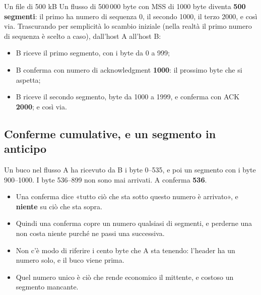 \begin{esempio}{Un file di 500 kB}
Un flusso di 500\,000 byte con MSS di 1000 byte diventa \textbf{500 segmenti}: il primo ha numero di
sequenza 0, il secondo 1000, il terzo 2000, e così via. Trascurando per semplicità lo scambio iniziale
(nella realtà il primo numero di sequenza è scelto a caso), dall'host A all'host B:
\begin{itemize}
    \item B riceve il primo segmento, con i byte da 0 a 999;
    \item B conferma con numero di acknowledgment \textbf{1000}: il prossimo byte che si aspetta;
    \item B riceve il secondo segmento, byte da 1000 a 1999, e conferma con ACK \textbf{2000}; e così via.
\end{itemize}
\end{esempio}


\subsection{Conferme cumulative, e un segmento in anticipo}

\begin{esempio}{Un buco nel flusso}
A ha ricevuto da B i byte 0--535, e poi un segmento con i byte 900--1000. I byte 536--899 non sono mai arrivati. A
conferma \textbf{536}.
\end{esempio}

\begin{itemize}
    \item Una conferma dice «tutto ciò che sta sotto questo numero è arrivato», e \textbf{niente} su ciò che sta sopra.
    \item Quindi una conferma copre un numero qualsiasi di segmenti, e perderne una non costa niente purché ne passi una
          successiva.
    \item Non c'è modo di riferire i cento byte che A sta tenendo: l'header ha un numero solo, e il buco viene prima.
    \item Quel numero unico è ciò che rende economico il mittente, e costoso un segmento mancante.
\end{itemize}

